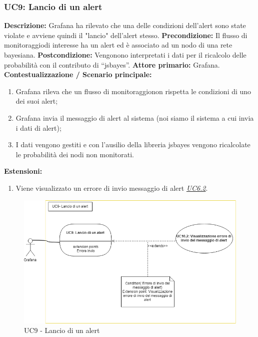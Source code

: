 		        \subsubsection{UC9: Lancio di un alert}
                    \textbf{Descrizione:} Grafana ha rilevato che una delle condizioni dell'alert sono state violate e avviene quindi il "lancio" dell'alert stesso.
                    \newline
                    \textbf{Precondizione:} Il flusso di monitoraggio\pedice di interesse ha un alert ed è associato ad un nodo di una rete bayesiana.
                    \newline
                    \textbf{Postcondizione:} Vengonono interpretati i dati per il ricalcolo delle probabilità con il contributo di “jsbayes”.
                    \newline
                    \textbf{Attore primario:} Grafana.
                    \newline
                    \textbf{Contestualizzazione / Scenario principale:} \begin{enumerate}
                            \item Grafana rileva che un flusso di monitoraggio\pedice non rispetta le condizioni di uno dei suoi alert;
                            \item Grafana invia il messaggio di alert al sistema (noi siamo il sistema a cui invia i dati di alert);
                            \item I dati vengono gestiti e con l’ausilio della libreria jsbayes vengono ricalcolate le probabilità dei nodi non monitorati.
                        \end{enumerate}
                    
                    \textbf{Estensioni:} 
                    \begin{enumerate}
                        \item Viene visualizzato un errore di invio messaggio di alert \underline{\textit{UC6.2}}.
                    \end{enumerate}
                    
                	\begin{figure}[!htbp]
                    	\centering
                    	\includegraphics[width=\textwidth]{UC9.png}
                    	\caption{UC9 - Lancio di un alert}
                    \end{figure}
                \clearpage
                        
